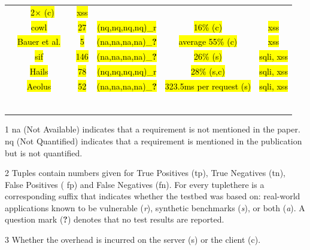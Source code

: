 \documentclass[10pt,journal,compsoc]{IEEEtran}
\makeatletter
\newcommand{\hlc}[2][yellow]{ {\sethlcolor{#1} \hl{#2}} }
\newcommand{\thickhline}{%
    \noalign {\ifnum 0=`}\fi \hrule height 1pt
    \futurelet \reserved@a \@xhline
}
\makeatother
\begin{document}
\begin{table}[t]
\begin{threeparttable}
\begin{small}
{\begin{tabular}{l|c|c|cc|c}
  & \hlc[yellow]{2$\times$ ({\sc c})} & \hlc[yellow]{{\sc xss}} \\
  &   \hlc[yellow]{{\sc cowl}}~\cite{SYMRHKM14} & \hlc[yellow]{27} & \hlc[yellow]{({\sc nq},{\sc nq},{\sc nq},{\sc nq})\_r}
  & \hlc[yellow]{16\% ({\sc c})} & \hlc[yellow]{{\sc xss}} \\
  &   \hlc[yellow]{Bauer et al.}~\cite{BCJPST15} & \hlc[yellow]{5} & \hlc[yellow]{({\sc na},{\sc na},{\sc na},{\sc na})\_{\bf ?}}
  & \hlc[yellow]{average 55\% ({\sc c})} & \hlc[yellow]{{\sc xss}} \\
  &   \hlc[yellow]{{\sc sif}}~\cite{CVMA07} & \hlc[yellow]{146} & \hlc[yellow]{({\sc na},{\sc na},{\sc na},{\sc na})\_{\bf ?}}
  & \hlc[yellow]{26\% ({\sc s})} & \hlc[yellow]{{\sc sql}i, {\sc xss}} \\
  &   \hlc[yellow]{Hails}~\cite{GLSTMMR12} & \hlc[yellow]{78} & \hlc[yellow]{({\sc nq},{\sc nq},{\sc nq},{\sc nq})\_r}
  & \hlc[yellow]{28\% ({\sc s},{\sc c})} & \hlc[yellow]{{\sc sql}i, {\sc xss}} \\
  &   \hlc[yellow]{Aeolus}~\cite{CPSPBCCSL12} & \hlc[yellow]{52} & \hlc[yellow]{({\sc na},{\sc na},{\sc na},{\sc na})\_{\bf ?}}
  & \hlc[yellow]{323.5ms per request ({\sc s})} & \hlc[yellow]{{\sc sql}i, {\sc xss}} \\
  \thickhline
    \end{tabular}}
    \vspace{-0.5mm}
    \begin{tablenotes}
  \begin{tiny}
        \item[1] {\sc na} (Not Available) indicates that a requirement is not mentioned in the paper.
  {\sc nq} (Not Quantified) indicates that a requirement is mentioned in the publication
  but is not quantified.
      \item[2] Tuples contain numbers given for True Positives
        ({\sc tp}), True Negatives ({\sc tn}), False Positives ({\sc
          fp}) and False Negatives ({\sc fn}). For every tuple\newline there is a corresponding suffix that indicates whether the testbed was
  based on: real-world applications known to be vulnerable ({\it r}),
  synthetic benchmarks ({\it s}), or both ({\it a}).
  A question mark ({\bf ?}) denotes that no test results are reported.
    \item[3] Whether the overhead is incurred on the server ({\sc s}) or the client ({\sc c}). 

\end{tiny}
\end{tablenotes}
\end{small}
\end{threeparttable}
\end{table}
\end{document}

